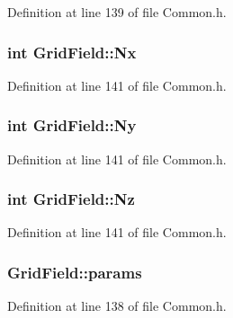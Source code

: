 Definition at line 139 of file Common.\+h.

\subsubsection[{\texorpdfstring{Nx}{Nx}}]{\setlength{\rightskip}{0pt plus 5cm}int Grid\+Field\+::\+Nx}\hypertarget{struct_grid_field_a7777c8b5bf6db312fcceecdfd012c9ca}{}\label{struct_grid_field_a7777c8b5bf6db312fcceecdfd012c9ca}


Definition at line 141 of file Common.\+h.

\subsubsection[{\texorpdfstring{Ny}{Ny}}]{\setlength{\rightskip}{0pt plus 5cm}int Grid\+Field\+::\+Ny}\hypertarget{struct_grid_field_a4cc2cac3066c31f0e6af9745cf994674}{}\label{struct_grid_field_a4cc2cac3066c31f0e6af9745cf994674}


Definition at line 141 of file Common.\+h.

\subsubsection[{\texorpdfstring{Nz}{Nz}}]{\setlength{\rightskip}{0pt plus 5cm}int Grid\+Field\+::\+Nz}\hypertarget{struct_grid_field_ae624c780496411e632ca5581b84a6177}{}\label{struct_grid_field_ae624c780496411e632ca5581b84a6177}


Definition at line 141 of file Common.\+h.

\subsubsection[{\texorpdfstring{params}{params}}]{ Grid\+Field\+::params}\hypertarget{struct_grid_field_a735e3033049d10f084e74083ae44dd21}{}\label{struct_grid_field_a735e3033049d10f084e74083ae44dd21}


Definition at line 138 of file Common.\+h.

